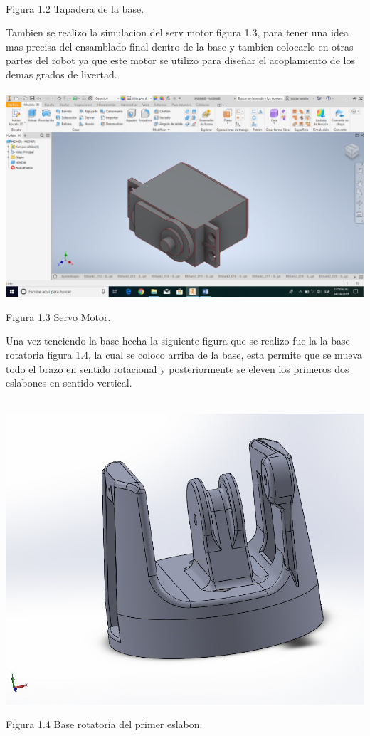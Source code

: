\documentclass[12pt,letterpaper]{article}
\begin{document}
\\
\begin{center}
Figura 1.2 Tapadera de la base.
\end{center}
Tambien se realizo la simulacion del serv motor figura 1.3, para tener una idea mas precisa del ensamblado final dentro de la base y tambien colocarlo en otras partes del robot ya que este motor se utilizo para diseñar el acoplamiento de los demas grados de livertad.
\\\\
\includegraphics[scale=0.47]{imag10.png} 
\begin{center}
Figura 1.3 Servo Motor.
\end{center}

\newpage
Una vez teneiendo la base hecha la siguiente figura que se realizo fue la la base rotatoria figura 1.4, la cual se coloco arriba de la base, esta permite que se mueva todo el brazo en sentido rotacional y posteriormente se eleven los primeros dos eslabones en sentido vertical.
\\\\
\begin{center}
\includegraphics[scale=0.5]{img11.jpg} 
\end{center}
\begin{center}
Figura 1.4 Base rotatoria del primer eslabon.
\end{center}
\end{document}
